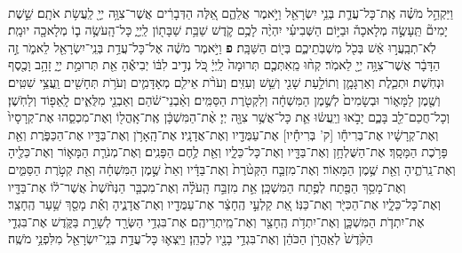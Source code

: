 \documentclass[twoside, openany, parskip=half, 11pt]{book}
\begin{document}
\begin{footnotesize}
\begin{multicols}{2}
\\
 וַיַּקְהֵ֣ל מֹשֶׁ֗ה אֶֽת־כָּל־עֲדַ֛ת בְּנֵ֥י יִשְׂרָאֵ֖ל וַיֹּ֣אמֶר אֲלֵהֶ֑ם אֵ֚לֶּה הַדְּבָרִ֔ים אֲשֶׁר־צִוָּ֥ה יְיָ֖ לַֽעֲשׂ֥ת אֹתָֽם׃ שֵׁ֣שֶׁת יָמִים֘ תֵּֽעָשֶׂ֣ה מְלָאכָה֒ וּבַיּ֣וֹם הַשְּׁבִיעִ֗י יִהְיֶ֨ה לָכֶ֥ם קֹ֛דֶשׁ שַׁבַּ֥ת שַׁבָּת֖וֹן לַֽיְיָ֑ כָּל־הָֽעֹשֶׂ֥ה ב֛וֹ מְלָאכָ֖ה יוּמָֽת׃ לֹֽא־תְבַֽעֲר֣וּ אֵ֔שׁ בְּכֹ֖ל מֽשְׁבֹֽתֵיכֶ֑ם בְּי֖וֹם הַשַּׁבָּֽת׃ \textbf{פ} 
וַיֹּ֣אמֶר מֹשֶׁ֔ה אֶל־כָּל־עֲדַ֥ת בְּנֵֽי־יִשְׂרָאֵ֖ל לֵאמֹ֑ר זֶ֣ה הַדָּבָ֔ר אֲשֶׁר־צִוָּ֥ה יְיָ֖ לֵאמֹֽר׃ קְח֨וּ מֵֽאִתְּכֶ֤ם תְּרוּמָה֙ לַֽיְיָ֔ כֹּ֚ל נְדִ֣יב לִבּ֔וֹ יְבִיאֶ֕הָ אֵ֖ת תְּרוּמַ֣ת יְיָ֑ זָהָ֥ב וָכֶ֖סֶף וּנְחֹֽשֶׁת׃ וּתְכֵ֧לֶת וְאַרְגָּמָ֛ן וְתוֹלַ֥עַת שָׁנִ֖י וְשֵׁ֥שׁ וְעִזִּֽים׃ וְעֹרֹ֨ת אֵילִ֧ם מְאָדָּמִ֛ים וְעֹרֹ֥ת תְּחָשִׁ֖ים וַֽעֲצֵ֥י שִׁטִּֽים׃ וְשֶׁ֖מֶן לַמָּא֑וֹר וּבְשָׂמִים֙ לְשֶׁ֣מֶן הַמִּשְׁחָ֔ה וְלִקְטֹ֖רֶת הַסַּמִּֽים׃ וְאַ֨בְנֵי־שֹׁ֔הַם וְאַבְנֵ֖י מִלֻּאִ֑ים לָֽאֵפ֖וֹד וְלַחֹֽשֶׁן׃ וְכָל־חֲכַם־לֵ֖ב בָּכֶ֑ם יָבֹ֣אוּ וְיַֽעֲשׂ֔וּ אֵ֛ת כָּל־אֲשֶׁ֥ר צִוָּ֖ה יְיָ׃ 
אֶ֨ת־הַמִּשְׁכָּ֔ן אֶֽת־אָֽהֳל֖וֹ וְאֶת־מִכְסֵ֑הוּ אֶת־קְרָסָיו֙ וְאֶת־קְרָשָׁ֔יו אֶת־בְּרִיחָ֕ו [ק' בְּרִיחָ֕יו] אֶת־עַמֻּדָ֖יו וְאֶת־אֲדָנָֽיו׃ אֶת־הָֽאָרֹ֥ן וְאֶת־בַּדָּ֖יו אֶת־הַכַּפֹּ֑רֶת וְאֵ֖ת פָּרֹ֥כֶת הַמָּסָֽךְ׃ אֶת־הַשֻּׁלְחָ֥ן וְאֶת־בַּדָּ֖יו וְאֶת־כָּל־כֵּלָ֑יו וְאֵ֖ת לֶ֥חֶם הַפָּנִֽים׃ וְאֶת־מְנֹרַ֧ת הַמָּא֛וֹר וְאֶת־כֵּלֶ֖יהָ וְאֶת־נֵֽרֹתֶ֑יהָ וְאֵ֖ת שֶׁ֥מֶן הַמָּאֽוֹר׃ וְאֶת־מִזְבַּ֤ח הַקְּטֹ֨רֶת֙ וְאֶת־בַּדָּ֔יו וְאֵת֙ שֶׁ֣מֶן הַמִּשְׁחָ֔ה וְאֵ֖ת קְטֹ֣רֶת הַסַּמִּ֑ים וְאֶת־מָסַ֥ךְ הַפֶּ֖תַח לְפֶ֥תַח הַמִּשְׁכָּֽן׃ אֵ֣ת מִזְבַּ֣ח הָֽעֹלָ֗ה וְאֶת־מִכְבַּ֤ר הַנְּחֹ֨שֶׁת֙ אֲשֶׁר־ל֔וֹ אֶת־בַּדָּ֖יו וְאֶת־כָּל־כֵּלָ֑יו אֶת־הַכִּיֹּ֖ר וְאֶת־כַּנּֽוֹ׃ אֵ֚ת קַלְעֵ֣י הֶֽחָצֵ֔ר אֶת־עַמֻּדָ֖יו וְאֶת־אֲדָנֶ֑יהָ וְאֵ֕ת מָסַ֖ךְ שַׁ֥עַר הֶֽחָצֵֽר׃ אֶת־יִתְדֹ֧ת הַמִּשְׁכָּ֛ן וְאֶת־יִתְדֹ֥ת הֶֽחָצֵ֖ר וְאֶת־מֵֽיתְרֵיהֶֽם׃ אֶת־בִּגְדֵ֥י הַשְּׂרָ֖ד לְשָׁרֵ֣ת בַּקֹּ֑דֶשׁ אֶת־בִּגְדֵ֤י הַקֹּ֨דֶשׁ֙ לְאַֽהֲרֹ֣ן הַכֹּהֵ֔ן וְאֶת־בִּגְדֵ֥י בָנָ֖יו לְכַהֵֽן׃ וַיֵּֽצְא֛וּ כָּל־עֲדַ֥ת בְּנֵֽי־יִשְׂרָאֵ֖ל מִלִּפְנֵ֥י מֹשֶֽׁה׃


\end{multicols}
\end{footnotesize}
\end{document}
